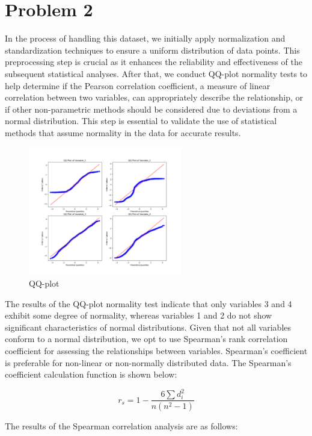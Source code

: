 \documentclass{swmcmthesis}
\begin{document}
\section{Problem 2}
In the process of handling this dataset, we initially apply normalization and standardization techniques to ensure a uniform distribution of data points. This preprocessing step is crucial as it enhances the reliability and effectiveness of the subsequent statistical analyses. After that, we conduct QQ-plot normality tests to help determine if the Pearson correlation coefficient, a measure of linear correlation between two variables, can appropriately describe the relationship, or if other non-parametric methods should be considered due to deviations from a normal distribution. This step is essential to validate the use of statistical methods that assume normality in the data for accurate results.
\begin{figure}[h!t]
	\centering
	\includegraphics[width=0.6\textwidth]{Problem 2/Problem 2/QQ Plot.png}
	\caption{QQ-plot}
\end{figure}

The results of the QQ-plot normality test indicate that only variables 3 and 4 exhibit some degree of normality, whereas variables 1 and 2 do not show significant characteristics of normal distributions. Given that not all variables conform to a normal distribution, we opt to use Spearman's rank correlation coefficient for assessing the relationships between variables. Spearman's coefficient is preferable for non-linear or non-normally distributed data. The Spearman's coefficient calculation function is shown below:

\begin{equation}
    r_s = 1 - \frac{6 \sum d_i^2}{n(n^2 - 1)}
\end{equation}

\vspace{1.5em}
\noindent The results of the Spearman correlation analysis are as follows:
\end{document}
